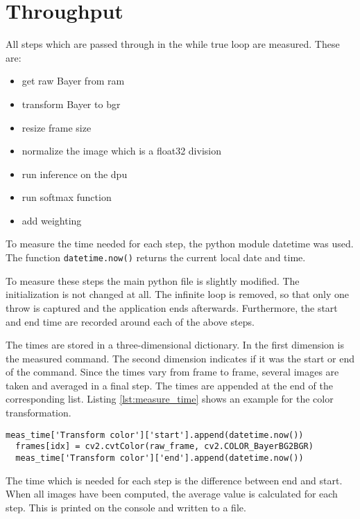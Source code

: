 \section{Throughput}
\label{sec:verification_and_benchmark:throughput}

All steps which are passed through in the while true loop are measured. 
These are:
\begin{itemize}
	\item get raw Bayer from \acrshort{ram}
	\item transform Bayer to \acrshort{bgr} 
	\item resize frame size %
	\item normalize the image which is a float32 division
	\item run inference on the \acrshort{dpu}
	\item run softmax function
	\item add weighting
\end{itemize}

To measure the time needed for each step, the python module datetime was used.
The function \texttt{datetime.now()} returns the current local date and time.

To measure these steps the main python file is slightly modified.
The initialization is not changed at all.
The infinite loop is removed, so that only one throw is captured and the application ends afterwards.
Furthermore, the start and end time are recorded around each of the above steps.

The times are stored in a three-dimensional dictionary.
In the first dimension is the measured command.
The second dimension indicates if it was the start or end of the command.
Since the times vary from frame to frame, several images are taken and averaged in a final step.
The times are appended at the end of the corresponding list.
Listing \ref{lst:measure_time} shows an example for the color transformation.

\begin{lstlisting}[style=python, caption={Measure needed time for the color transformation}, label=lst:measure_time]
  meas_time['Transform color']['start'].append(datetime.now())
  frames[idx] = cv2.cvtColor(raw_frame, cv2.COLOR_BayerBG2BGR)
  meas_time['Transform color']['end'].append(datetime.now())
\end{lstlisting}

The time which is needed for each step is the difference between end and start.
When all images have been computed, the average value is calculated for each step.
This is printed on the console and written to a file.

